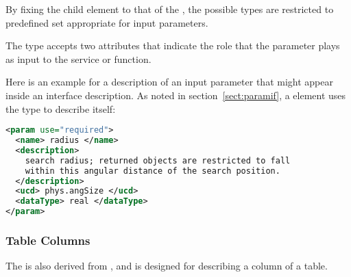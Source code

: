 \documentclass[11pt,a4paper]{ivoa}
\begin{document}


By fixing the  child element to that of the
, the possible types are restricted to
predefined set appropriate for input parameters.



The  type accepts two attributes that
indicate the role that the parameter plays as input to the service or
function.


Here is an example for a description
of an input parameter that might appear inside an
 interface description.  As noted in
section~\ref{sect:paramif}, a 
element uses the  type to describe itself:

\begin{lstlisting}[language=XML]
<param use="required">
  <name> radius </name>
  <description>
    search radius; returned objects are restricted to fall 
    within this angular distance of the search position.
  </description>
  <ucd> phys.angSize </ucd>
  <dataType> real </dataType>
</param>
\end{lstlisting}

\subsubsection{Table Columns}
\label{sect:columns}


The  is also derived from
, and is designed for describing a column of
a table.
\end{document}
